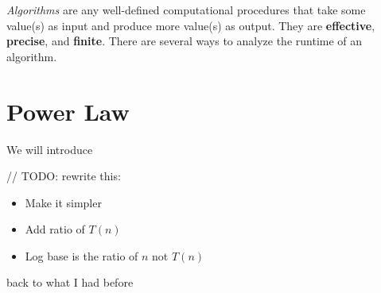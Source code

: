 
\textit{Algorithms} are any well-defined computational procedures that take some value(s) as input and produce more value(s) as output. They are \textbf{effective}, \textbf{precise}, and \textbf{finite}. There are several ways to analyze the runtime of an algorithm.

\section{Power Law}

We will introduce 

// TODO: rewrite this:

\begin{itemize}
  \item Make it simpler
  \item Add ratio of $T(n)$
  \item Log base is the ratio of $n$ not $T(n)$
\end{itemize}

back to what I had before

